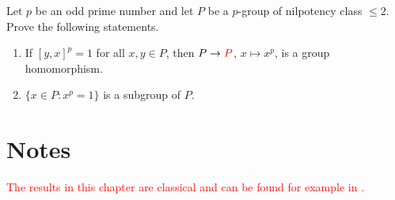 \begin{prob}
	Let $p$ be an odd prime number and  
	let $P$ be a $p$-group of nilpotency class $\leq2$. Prove the following statements.
	\begin{enumerate}
	\item 	If $[y,x]^p=1$ for all $x,y\in P$, then $P\to \textcolor{red}{P}$,
	$x\mapsto x^p$, is a group homomorphism. 
	\item $\{x\in P:x^p=1\}$ is a subgroup of $P$. 
	\end{enumerate}
\end{prob}





\section{Notes}

\textcolor{red}{The results in this chapter are classical and can be found for example in \cite{MR648604}.}

